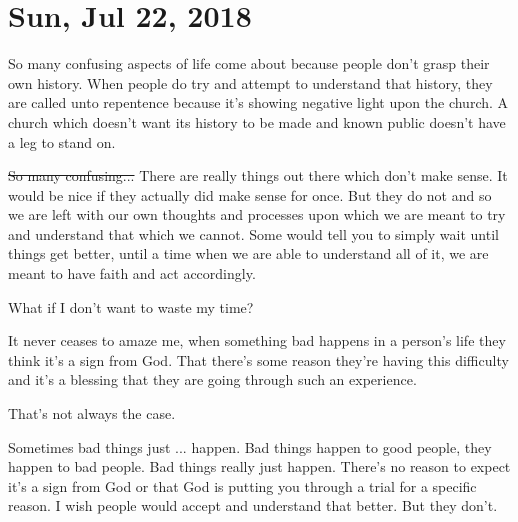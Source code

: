 \section{Sun, Jul 22, 2018}

So many confusing aspects of life come about because people don't grasp their own
history. When people do try and attempt to understand that history, they are called
unto repentence because it's showing negative light upon the church. A church which
doesn't want its history to be made and known public doesn't have a leg to stand on.

\st{So many confusing...} There are really things out there which don't make sense.
It would be nice if they actually did make sense for once. But they do not and so we
are left with our own thoughts and processes upon which we are meant to try and
understand that which we cannot. Some would tell you to simply wait until things get
better, until a time when we are able to understand all of it, we are meant to have
faith and act accordingly.

What if I don't want to waste my time?

It never ceases to amaze me, when something bad happens in a person's life they think
it's a sign from God. That there's some reason they're having this difficulty and
it's a blessing that they are going through such an experience.

That's not always the case.

Sometimes bad things just ... happen. Bad things happen to good people, they happen
to bad people. Bad things really just happen. There's no reason to expect it's a sign
from God or that God is putting you through a trial for a specific reason. I wish
people would accept and understand that better. But they don't.